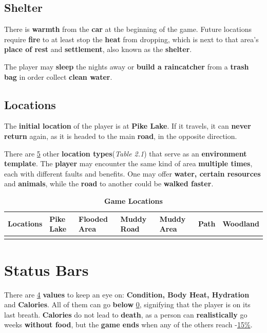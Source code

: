 		\subsection{Shelter}
			\par There is \textbf{warmth} from the \textbf{car} at the beginning of the game. Future locations require \textbf{fire} to at least stop the \textbf{heat} from dropping, which is next to that area's \textbf{place of rest} and \textbf{settlement}, also known as the \textbf{shelter}.
			\par The player may \textbf{sleep} the nights away or \textbf{build a raincatcher} from a \textbf{trash bag} in order collect \textbf{clean water}.

		\subsection{Locations}
			\par The \textbf{initial location} of the player is at \textbf{Pike Lake}. If it travels, it can \textbf{never return} again, as it is headed to the main \textbf{road}, in the opposite direction. 
			\par There are \underline{5} other \textbf{location types}(\textit{Table 2.1}) that serve as an \textbf{environment template}. The \textbf{player} may encounter the same kind of area \textbf{multiple times}, each with different faults and benefits. One may offer \textbf{water, certain resources} and \textbf{animals}, while the \textbf{road} to another could be \textbf{walked faster}.
			\begin{longtable}{|C{7em}|C{4.3em}|C{4.3em}|C{4.3em}|C{4.3em}|C{3.7em}|C{5em}|}
			   \toprule
			    \textcolor[rgb]{ 1,  1,  1}{\textbf{Locations}} & \textbf{Pike Lake} & \textbf{Flooded Area} & \textbf{Muddy Road} & \textbf{Muddy Area} & \textbf{Path} & \textbf{Woodland} \\
			   \bottomrule	
			\caption{\textbf{Game Locations}}
			\end{longtable}		
		

	\section{Status Bars}
		
		\par There are \underline{4} \textbf{values} to keep an eye on: \textbf{Condition, Body Heat, Hydration} and \textbf{Calories}. All of them can go \textbf{below} \underline{0}, signifying that the player is on its last breath. \textbf{Calories} do not lead to \textbf{death}, as a person can \textbf{realistically} go weeks \textbf{without food}, but the \textbf{game ends} when any of the others reach -\underline{15\%}.  
		

